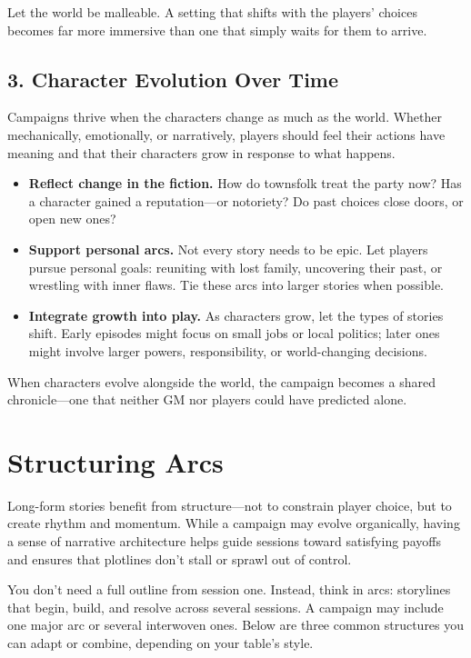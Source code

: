 Let the world be malleable. A setting that shifts with the players’ choices becomes far more immersive than one that simply waits for them to arrive.

\subsection*{3. Character Evolution Over Time}

Campaigns thrive when the characters change as much as the world. Whether mechanically, emotionally, or narratively, players should feel their actions have meaning and that their characters grow in response to what happens.

\begin{itemize}
    \item \textbf{Reflect change in the fiction.} How do townsfolk treat the party now? Has a character gained a reputation—or notoriety? Do past choices close doors, or open new ones?

    \item \textbf{Support personal arcs.} Not every story needs to be epic. Let players pursue personal goals: reuniting with lost family, uncovering their past, or wrestling with inner flaws. Tie these arcs into larger stories when possible.

    \item \textbf{Integrate growth into play.} As characters grow, let the types of stories shift. Early episodes might focus on small jobs or local politics; later ones might involve larger powers, responsibility, or world-changing decisions.
\end{itemize}

When characters evolve alongside the world, the campaign becomes a shared chronicle—one that neither GM nor players could have predicted alone.



\section{Structuring Arcs}

Long-form stories benefit from structure—not to constrain player choice, but to create rhythm and momentum. While a campaign may evolve organically, having a sense of narrative architecture helps guide sessions toward satisfying payoffs and ensures that plotlines don’t stall or sprawl out of control.

You don’t need a full outline from session one. Instead, think in arcs: storylines that begin, build, and resolve across several sessions. A campaign may include one major arc or several interwoven ones. Below are three common structures you can adapt or combine, depending on your table’s style.

